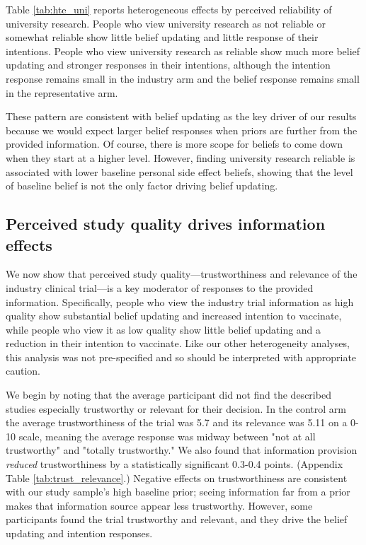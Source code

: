 Table \ref{tab:hte_uni} reports heterogeneous effects by perceived reliability of university
research. People who view university research as not reliable or somewhat reliable
show little belief updating and little response of their intentions. People who view
university research as reliable show much more belief updating and stronger responses
in their intentions, although the intention response remains small in the industry arm
and the belief response remains small in the representative arm.

These pattern are consistent with belief updating as the key driver of our results 
because we would expect larger belief responses when priors are further from the provided 
information. Of course, there is more scope for beliefs to come down when they start at 
a higher level. However, finding university research reliable is associated with lower 
baseline personal side effect beliefs, showing that the level of baseline belief is not 
the only factor driving belief updating.

\subsection{Perceived study quality drives information effects}

We now show that perceived study quality---trustworthiness and 
relevance of the industry clinical trial---is a key  moderator of responses to the provided information. Specifically, people who view the industry trial information as high quality show substantial belief updating and increased intention to vaccinate, while people who view  it as low quality show little belief updating and a reduction in their intention to vaccinate. Like our other heterogeneity analyses, this analysis was not pre-specified and so should be interpreted with appropriate caution.

We begin by noting that the average participant did not find the described studies especially trustworthy or relevant for their decision. In the control arm the average
trustworthiness of the trial was 5.7 and its relevance was 5.11 on a 0-10 scale, meaning the average response was midway between "not at all trustworthy" and "totally trustworthy." We also found that information provision {\em reduced} trustworthiness by a statistically significant 0.3-0.4 points. (Appendix Table \ref{tab:trust_relevance}.) Negative effects on trustworthiness are consistent with our study sample's high baseline  prior; seeing information far from a prior makes that information source appear less  trustworthy. However, some participants found the trial trustworthy and relevant, and they drive the  belief updating and intention responses. 

